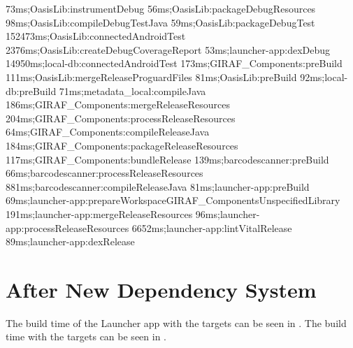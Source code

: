 \begin{gradlecode}[caption=Running time of tasks of old dependency system,label=lst:full_data_old_dep_system]
73ms;OasisLib:instrumentDebug
56ms;OasisLib:packageDebugResources
98ms;OasisLib:compileDebugTestJava
59ms;OasisLib:packageDebugTest
152473ms;OasisLib:connectedAndroidTest
2376ms;OasisLib:createDebugCoverageReport
53ms;launcher-app:dexDebug
14950ms;local-db:connectedAndroidTest
173ms;GIRAF_Components:preBuild
111ms;OasisLib:mergeReleaseProguardFiles
81ms;OasisLib:preBuild
92ms;local-db:preBuild
71ms;metadata_local:compileJava
186ms;GIRAF_Components:mergeReleaseResources
204ms;GIRAF_Components:processReleaseResources
64ms;GIRAF_Components:compileReleaseJava
184ms;GIRAF_Components:packageReleaseResources
117ms;GIRAF_Components:bundleRelease
139ms;barcodescanner:preBuild
66ms;barcodescanner:processReleaseResources
881ms;barcodescanner:compileReleaseJava
81ms;launcher-app:preBuild
69ms;launcher-app:prepareWorkspaceGIRAF_ComponentsUnspecifiedLibrary
191ms;launcher-app:mergeReleaseResources
96ms;launcher-app:processReleaseResources
6652ms;launcher-app:lintVitalRelease
89ms;launcher-app:dexRelease
\end{gradlecode}

\section{After New Dependency System}
The build time of the Launcher app with the targets  can be seen in . The build time with the targets  can be seen in .

